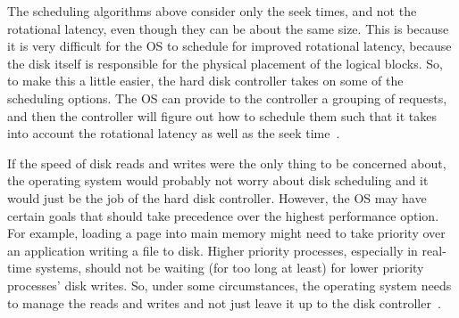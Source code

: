 The scheduling algorithms above consider only the seek times, and not the rotational latency, even though they can be about the same size. This is because it is very difficult for the OS to schedule for improved rotational latency, because the disk itself is responsible for the physical placement of the logical blocks. So, to make this a little easier, the hard disk controller takes on some of the scheduling options. The OS can provide to the controller a grouping of requests, and then the controller will figure out how to schedule them such that it takes into account the rotational latency as well as the seek time~\cite{osc}.

If the speed of disk reads and writes were the only thing to be concerned about, the operating system would probably not worry about disk scheduling and it would just be the job of the hard disk controller. However, the OS may have certain goals that should take precedence over the highest performance option. For example, loading a page into main memory might need to take priority over an application writing a file to disk. Higher priority processes, especially in real-time systems, should not be waiting (for too long at least) for lower priority processes' disk writes. So, under some circumstances, the operating system needs to manage the reads and writes and not just leave it up to the disk controller~\cite{osc}.




